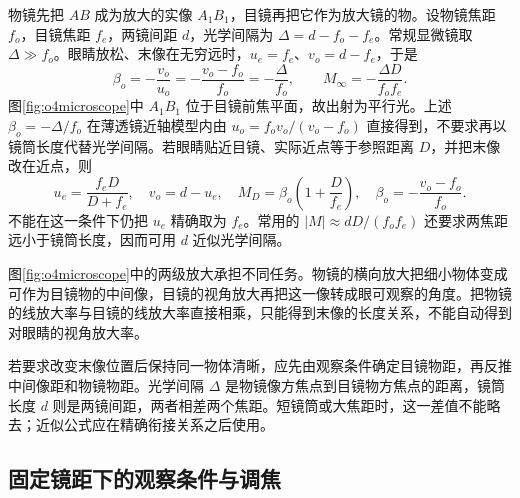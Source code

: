 物镜先把 \(AB\) 成为放大的实像 \(A_1B_1\)，目镜再把它作为放大镜的物。设物镜焦距 \(f_o\)，目镜焦距 \(f_e\)，两镜间距 \(d\)，光学间隔为 \(\Delta=d-f_o-f_e\)。常规显微镜取 \(\Delta\gg f_o\)。眼睛放松、末像在无穷远时，\(u_e=f_e\)、\(v_o=d-f_e\)，于是
\[
 \beta_o=-\frac{v_o}{u_o}=-\frac{v_o-f_o}{f_o}=-\frac{\Delta}{f_o},
 \qquad \boxed{M_\infty=-\frac{\Delta D}{f_of_e}}.
\]
图\ref{fig:o4microscope}中 \(A_1B_1\) 位于目镜前焦平面，故出射为平行光。上述 $\beta_o=-\Delta/f_o$ 在薄透镜近轴模型内由 $u_o=f_ov_o/(v_o-f_o)$ 直接得到，不要求再以镜筒长度代替光学间隔。若眼睛贴近目镜、实际近点等于参照距离 $D$，并把末像改在近点，则
\[
 u_e=\frac{f_eD}{D+f_e},\quad v_o=d-u_e,\quad
 M_D=\beta_o\left(1+\frac D{f_e}\right),\quad
 \beta_o=-\frac{v_o-f_o}{f_o}.
\]
不能在这一条件下仍把 \(u_e\) 精确取为 \(f_e\)。常用的 \(|M|\approx dD/(f_of_e)\) 还要求两焦距远小于镜筒长度，因而可用 \(d\) 近似光学间隔。

图\ref{fig:o4microscope}中的两级放大承担不同任务。物镜的横向放大把细小物体变成可作为目镜物的中间像，目镜的视角放大再把这一像转成眼可观察的角度。把物镜的线放大率与目镜的线放大率直接相乘，只能得到末像的长度关系，不能自动得到对眼睛的视角放大率。

若要求改变末像位置后保持同一物体清晰，应先由观察条件确定目镜物距，再反推中间像距和物镜物距。光学间隔 $\Delta$ 是物镜像方焦点到目镜物方焦点的距离，镜筒长度 $d$ 则是两镜间距，两者相差两个焦距。短镜筒或大焦距时，这一差值不能略去；近似公式应在精确衔接关系之后使用。

\subsection{固定镜距下的观察条件与调焦}

